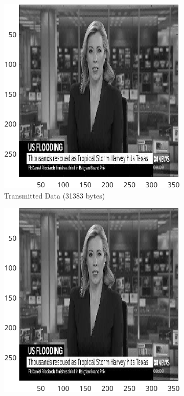 \documentclass{article}
\begin{document}
		\begin{figure}[ht]
		\centering
			\begin{subfigure}[t]{0.45\textwidth}
			\centering

			\includegraphics[width=\textwidth]{2B_Input4TD}

			\caption{Transmitted Data (31383 bytes)}
			\label{fig:2B_Input4TD}

		\end{subfigure}
		\hspace{1cm}
		\begin{subfigure}[t]{0.45\textwidth}
			\centering

			\includegraphics[width=\textwidth]{2B_Input4Reconstructed}


\end{subfigure}
\end{figure}
\end{document}
